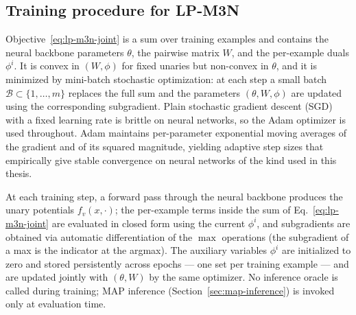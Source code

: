 \subsection{Training procedure for LP-M3N}
\label{subsec:training-procedure}

Objective~\eqref{eq:lp-m3n-joint} is a sum over training examples
and contains the neural backbone parameters $\theta$, the pairwise
matrix $W$, and the per-example duals $\phi^{i}$. It is convex in
$(W, \phi)$ for fixed unaries but non-convex in $\theta$, and it is
minimized by mini-batch stochastic optimization: at each step a
small batch $\mathcal{B} \subset \{1, \ldots, m\}$ replaces the
full sum and the parameters $(\theta, W, \phi)$ are updated using
the corresponding subgradient. Plain stochastic gradient descent
(SGD) with a fixed learning rate is brittle on neural networks, so
the Adam optimizer is used throughout. Adam maintains per-parameter
exponential moving averages of the gradient and of its squared
magnitude, yielding adaptive step sizes that empirically give
stable convergence on neural networks of the kind used in this
thesis.

At each training step, a forward pass through the neural backbone
produces the unary potentials $f_{v}(x, \cdot)$; the per-example
terms inside the sum of Eq.~\eqref{eq:lp-m3n-joint} are evaluated
in closed form using the current $\phi^{i}$, and subgradients are
obtained via automatic differentiation of the $\max$ operations
(the subgradient of a max is the indicator at the argmax). The
auxiliary variables $\phi^{i}$ are initialized to zero and stored
persistently across epochs --- one set per training example --- and
are updated jointly with $(\theta, W)$ by the same optimizer. No
inference oracle is called during training; MAP inference
(Section~\ref{sec:map-inference}) is invoked only at evaluation
time.
